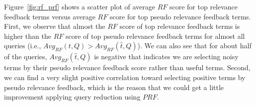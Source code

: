 Figure~\ref{fig:rf_prf} shows a scatter plot of average $\mathit{RF}$ score for top relevance feedback terms versus average $\mathit{RF}$ score for top pseudo relevance feedback terms. First, we observe that almost the $\mathit{RF}$ score of top relevance feedback terms is higher than the $\mathit{RF}$ score of top pseudo relevance feedback terms for almost all queries (i.e., $ Avg_{RF}(t, Q) > Avg_{RF}(\hat{t}, Q)$). We can also see that for about half of the queries, $Avg_{RF}(\hat{t}, Q)$ is negative that indicates we are selecting noisy terms by their pseudo relevance feedback score rather than useful terms. Second, we can find a very slight positive correlation toward selecting positive terms by pseudo relevance feedback, which is the reason that we could get a little improvement applying query reduction using $\mathit{PRF}$.  
